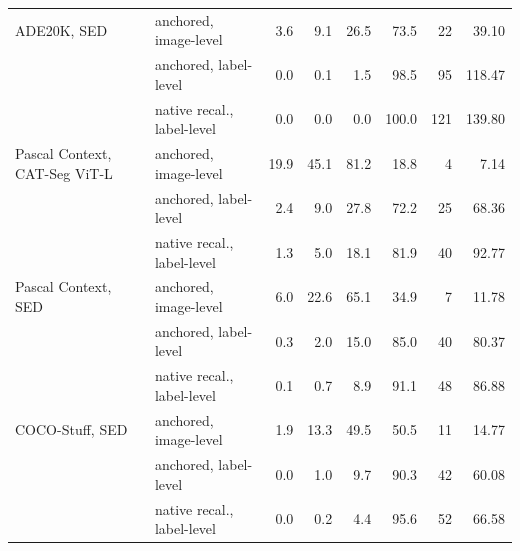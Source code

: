 \begin{tabular}{@{}llrrrrrr@{}}
\addlinespace
ADE20K, SED & anchored, image-level & 3.6 & 9.1 & 26.5 & 73.5 & 22 & 39.10 \\
 & anchored, label-level & 0.0 & 0.1 & 1.5 & 98.5 & 95 & 118.47 \\
 & native recal., label-level & 0.0 & 0.0 & 0.0 & 100.0 & 121 & 139.80 \\
\addlinespace
Pascal Context, CAT-Seg ViT-L & anchored, image-level & 19.9 & 45.1 & 81.2 & 18.8 & 4 & 7.14 \\
 & anchored, label-level & 2.4 & 9.0 & 27.8 & 72.2 & 25 & 68.36 \\
 & native recal., label-level & 1.3 & 5.0 & 18.1 & 81.9 & 40 & 92.77 \\
\addlinespace
Pascal Context, SED & anchored, image-level & 6.0 & 22.6 & 65.1 & 34.9 & 7 & 11.78 \\
 & anchored, label-level & 0.3 & 2.0 & 15.0 & 85.0 & 40 & 80.37 \\
 & native recal., label-level & 0.1 & 0.7 & 8.9 & 91.1 & 48 & 86.88 \\
\addlinespace
COCO-Stuff, SED & anchored, image-level & 1.9 & 13.3 & 49.5 & 50.5 & 11 & 14.77 \\
 & anchored, label-level & 0.0 & 1.0 & 9.7 & 90.3 & 42 & 60.08 \\
 & native recal., label-level & 0.0 & 0.2 & 4.4 & 95.6 & 52 & 66.58 \\
\bottomrule
\end{tabular}
